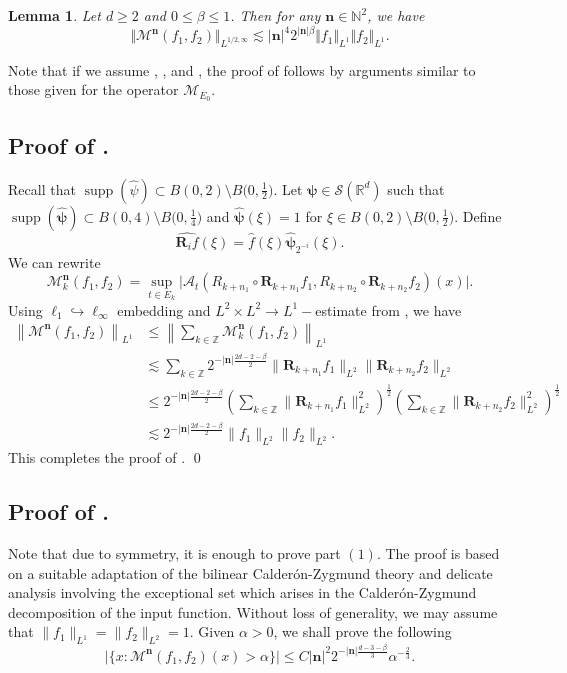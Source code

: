 \documentclass[a4paper,reqno]{amsart}
\newtheorem{lemma}{Lemma}[section]
\newcounter{old}
\numberwithin{equation}{section}
\newcommand{\R}{{\mathbb {R}}}
\newcommand{\N}{{\mathbb N}}
\newcommand{\Z}{{\mathbb Z}}
\newcommand{\supp}{\operatorname{supp}}
\begin{document}
	\begin{lemma}\label{L1}
		Let $d\geq2$ and $0\leq \beta\leq1$. Then for any $\mathbf{n}\in\N^2$, we have
		\[\Vert\mathcal{M}^{\mathbf{n}}(f_1,f_2)\Vert_{L^{1/2,\infty}}\lesssim |\mathbf{n}|^4 2^{|\mathbf{n}|\beta}\Vert f_1\Vert_{L^1}\Vert f_2\Vert_{L^1}.\]
	\end{lemma}
	Note that if we assume , , and , the proof of  follows by arguments similar to those given for the operator $\mathcal{M}_{E_0}$.  
	\subsection{Proof of .}
	Recall that $\supp(\widehat{\psi})\subset B(0,2)\setminus B\big(0,\frac{1}{2}\big)$. Let $\boldsymbol{\psi}\in\mathcal S(\R^d)$ such that $\supp(\widehat{\boldsymbol{\psi}})\subset B(0,4)\setminus B\big(0,\frac{1}{4}\big)$ and $\widehat{\boldsymbol{\psi}}(\xi)=1$ for $\xi\in B(0,2)\setminus B\big(0,\frac{1}{2}\big)$. Define
	\[\widehat{\mathbf{R}_{i}f}(\xi)=\hat{f}(\xi)\widehat{\boldsymbol{\psi}}_{2^{-i}}(\xi).\]
	We can rewrite
	\[\mathcal{M}^{\mathbf{n}}_k(f_1,f_2)=\sup_{t\in E_k}\Big|\mathcal{A}_{t}(R_{k+n_1}\circ\mathbf{R}_{k+n_1}f_1,R_{k+n_2}\circ\mathbf{R}_{k+n_2}f_2)(x)\Big|.\]
	Using $\ell_1\hookrightarrow\ell_\infty$ embedding and $L^2\times L^2\to L^1-$estimate from , we have
	\begin{align*}
		\left\|\mathcal{M}^{\mathbf{n}}(f_1,f_2)\right\|_{L^1}&\leq \left\|\sum_{k\in\Z}\mathcal{M}^{\mathbf{n}}_k(f_1,f_2)\right\|_{L^1}\\
		&\lesssim \sum_{k\in\Z}2^{-|\mathbf{n}|\frac{2d-2-\beta}{2}}\|\mathbf{R}_{k+n_1}f_1\|_{L^2}\|\mathbf{R}_{k+n_2}f_2\|_{L^2}\\
		&\leq 2^{-|\mathbf{n}|\frac{2d-2-\beta}{2}}\left(\sum_{k\in\Z}\|\mathbf{R}_{k+n_1}f_1\|_{L^2}^2\right)^{\frac{1}{2}}\left(\sum_{k\in\Z}\|\mathbf{R}_{k+n_2}f_2\|_{L^2}^2\right)^{\frac{1}{2}}\\
		&\lesssim 2^{-|\mathbf{n}|\frac{2d-2-\beta}{2}}\|f_1\|_{L^2}\|f_2\|_{L^2}.
	\end{align*}
	This completes the proof of .
	\qed
	
	\subsection{Proof of .}
	Note that due to symmetry, it is enough to prove part $(1)$. The proof is based on a suitable adaptation of the bilinear Calder\'{o}n-Zygmund theory and delicate analysis involving the exceptional set which arises in the Calder\'{o}n-Zygmund decomposition of the input function. Without loss of generality, we may assume that $\|f_1\|_{L^1}=\|f_2\|_{L^2}=1$. Given $\alpha>0$, we shall prove the following
	\begin{equation*}\label{weak2}
		\Big|\{x:\mathcal{M}^{\mathbf{n}}(f_1,f_2)(x)>\alpha\}\Big|\leq C|\mathbf{n}|^2 2^{-|\mathbf{n}|\frac{d-3-\beta}{3}}\alpha^{-\frac{2}{3}}.
	\end{equation*}
	
\end{document}
